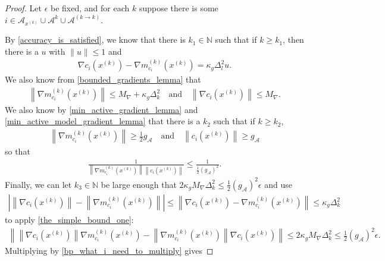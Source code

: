 \documentclass{article}
\theoremstyle{case}
\newcommand{\dk}{\Delta_k}
\newcommand{\gmcik}{{\nabla m_{c_i}^{(k)}\left(\xk\right)}}
\newcommand{\maxgrad}{{M_{\nabla}}}
\newcommand{\minactivegrad}{{ g_{\mathcal A} }}
\newcommand{\naturals}{\mathbb N}
\newcommand{\xk}{{x^{(k)}}}
\begin{document}
\begin{proof}
Let $\epsilon$ be fixed, and for each $k$ suppose there is some $i \in \mathcal A_{\xk} \cup \mathcal A^{k} \cup \mathcal A^{(k \to k)} $.

By \cref{accuracy_is_satisfied}, we know that there is $k_1 \in \naturals$ such that if $k \ge k_1$, then there is a $u$ with $\|u\| \le 1$ and
\begin{align*}
\nabla c_i\left( \xk \right) - \gmcik = \kappa_g \Delta_{l}^2 u.
\end{align*}
We also know from \cref{bounded_gradients_lemma} that
\begin{align*}
\left\|\gmcik\right\| \le \maxgrad + \kappa_g \dk^2 \quad \textrm{and} \quad \left\|\nabla c_i(\xk) \right\| \le \maxgrad.
\end{align*}
We also know by \cref{min_active_gradient_lemma} and \cref{min_active_model_gradient_lemma} that there is a $k_2$ such that if $k \ge k_2$,
\begin{align*}
\left\|\gmcik \right\| \ge \frac 1 2 \minactivegrad \quad \textrm{and} \quad \left\|c_i\left(\xk\right)\right\| \ge \minactivegrad
\end{align*}
so that
\begin{align}
\frac {1} {\left\|\gmcik \right\|  \left\|c_i\left(\xk\right)\right\|  } \le \frac 1 {\frac 1 2 \left(\minactivegrad\right)^2}. \label{bp_what_i_need_to_multiply}
\end{align}
Finally, we can let $k_3 \in \naturals$ be large enough that $2 \kappa_g\maxgrad \dk^2 \le \frac 1 2 \left(\minactivegrad\right)^2\epsilon$ and use
\begin{align}
\left|\left\|\nabla c_i\left(\xk \right)\right\|  - \left\|\gmcik\right\|\right| \le \left\|\nabla c_i\left( \xk \right) - \gmcik\right\| \le \kappa_g \dk^2 \label{bp_asdfasdffdsafdsa}
\end{align}
to apply \cref{the_simple_bound_one}: 
\begin{align*}
\left\|\left\|\nabla c_i\left(\xk \right)\right\| {\gmcik} - \left\|\gmcik\right\|\nabla c_i\left(\xk\right)\right\|
\le 2 \kappa_g\maxgrad \dk^2 \le \frac 1 2 \left(\minactivegrad\right)^2\epsilon.
\end{align*}
Multiplying by \cref{bp_what_i_need_to_multiply} gives

\end{proof}
\end{document}
